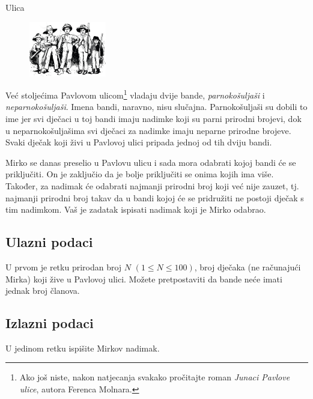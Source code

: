 \begin{statement}[
  problempoints=30,
  timelimit=1 sekunda,
  memorylimit=512 MiB,
]{Ulica}

\setlength\intextsep{-0.1cm}
\begin{figure}
\centering
\includegraphics[width=0.3\textwidth]{img/ulica.png}
\end{figure}

Već stoljećima Pavlovom ulicom\footnote{Ako još niste, nakon natjecanja svakako
pročitajte roman \textit{Junaci Pavlove ulice}, autora Ferenca Molnara.}
vladaju dvije bande, \textit{parnokošuljaši} i \textit{neparnokošuljaši}.
Imena bandi, naravno, nisu slučajna. Parnokošuljaši su dobili to ime jer svi
dječaci u toj bandi imaju nadimke koji su parni prirodni brojevi, dok u
neparnokošuljašima svi dječaci za nadimke imaju neparne prirodne brojeve.
Svaki dječak koji živi u Pavlovoj ulici pripada jednoj od tih dviju bandi.

Mirko se danas preselio u Pavlovu ulicu i sada mora odabrati kojoj bandi će se
priključiti. On je zaključio da je bolje priključiti se onima kojih ima više.
Također, za nadimak će odabrati najmanji prirodni broj koji već nije zauzet,
tj. najmanji prirodni broj takav da u bandi kojoj će se pridružiti ne postoji
dječak s tim nadimkom. Vaš je zadatak ispisati nadimak koji je Mirko odabrao.


\subsection*{Ulazni podaci}
U prvom je retku prirodan broj $N$ $(1 \le N \le 100)$, broj dječaka (ne
računajući Mirka) koji žive u Pavlovoj ulici. Možete pretpostaviti da bande
neće imati jednak broj članova.

\subsection*{Izlazni podaci}
U jedinom retku ispišite Mirkov nadimak.


\end{statement}
